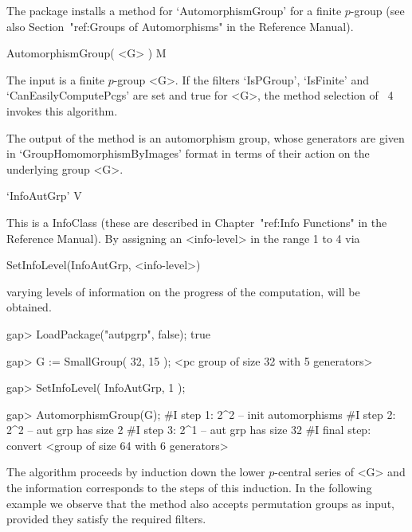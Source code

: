 

The {\AutPGrp} package installs a method for `AutomorphismGroup' for a 
finite $p$-group (see also Section~"ref:Groups of Automorphisms" 
in the {\GAP} Reference Manual).

\> AutomorphismGroup( <G> )   M 

The input is a finite $p$-group <G>. If the filters `IsPGroup', 
`IsFinite' and `CanEasilyComputePcgs' are set and true for <G>, 
the method selection of {\GAP}~4 invokes this algorithm. 

The output of the method is an automorphism group, whose generators 
are given in `GroupHomomorphismByImages' format in terms of their action 
on the underlying group <G>. 

\>`InfoAutGrp' V

This is a {\GAP} InfoClass (these are described in Chapter~"ref:Info
Functions" in the {\GAP} Reference Manual). By assigning an <info-level>
in the range 1 to 4 via

SetInfoLevel(InfoAutGrp, <info-level>)

varying levels of information on the progress of 
the computation, will be obtained. 

\beginexample 
gap> LoadPackage("autpgrp", false);
true

gap> G := SmallGroup( 32, 15 );
<pc group of size 32 with 5 generators>

gap> SetInfoLevel( InfoAutGrp, 1 );

gap> AutomorphismGroup(G);
#I  step 1: 2^2 -- init automorphisms 
#I  step 2: 2^2 -- aut grp has size 2
#I  step 3: 2^1 -- aut grp has size 32
#I  final step: convert
<group of size 64 with 6 generators>
\endexample

The algorithm proceeds by induction down the lower $p$-central
series of <G> and the information corresponds 
to the steps of this induction. In the following example we observe
that the method also accepts permutation groups as input, provided
they satisfy the required filters.


